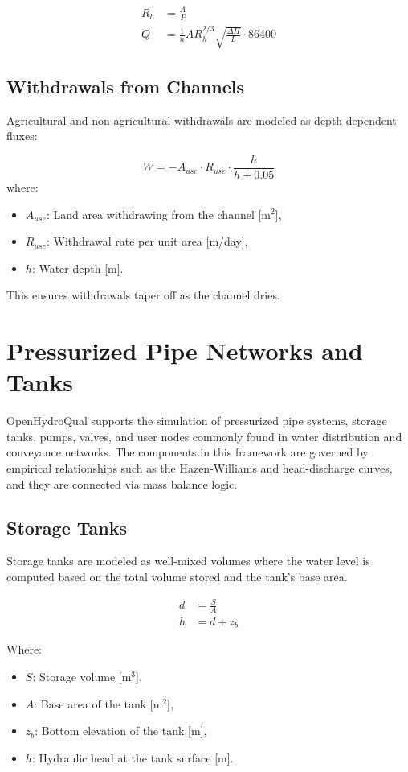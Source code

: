 \documentclass[12pt]{report}
\begin{document}
\begin{align}
R_h &= \frac{A}{P} \\
Q &= \frac{1}{n} A R_h^{2/3} \sqrt{\frac{\Delta H}{L}} \cdot 86400
\end{align}

\section{Withdrawals from Channels}

Agricultural and non-agricultural withdrawals are modeled as depth-dependent fluxes:

\begin{equation}
W = -A_{use} \cdot R_{use} \cdot \frac{h}{h + 0.05}
\end{equation}
where:
\begin{itemize}
\item $A_{use}$: Land area withdrawing from the channel [m$^2$],
\item $R_{use}$: Withdrawal rate per unit area [m/day],
\item $h$: Water depth [m].
\end{itemize}

This ensures withdrawals taper off as the channel dries.

\chapter{Pressurized Pipe Networks and Tanks}

OpenHydroQual supports the simulation of pressurized pipe systems, storage tanks, pumps, valves, and user nodes commonly found in water distribution and conveyance networks. The components in this framework are governed by empirical relationships such as the Hazen-Williams and head-discharge curves, and they are connected via mass balance logic.

\section{Storage Tanks}
Storage tanks are modeled as well-mixed volumes where the water level is computed based on the total volume stored and the tank's base area.

\begin{align}
d &= \frac{S}{A} \\
h &= d + z_b
\end{align}

Where:
\begin{itemize}
\item $S$: Storage volume [m$^3$],
\item $A$: Base area of the tank [m$^2$],
\item $z_b$: Bottom elevation of the tank [m],
\item $h$: Hydraulic head at the tank surface [m].
\end{itemize}
\end{document}
